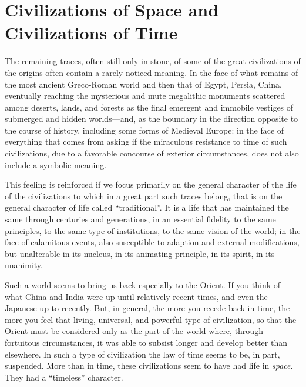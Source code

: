 \section{Civilizations of Space and Civilizations of Time}

The remaining traces, often still only in stone, of some of the great civilizations of the origins often contain a rarely noticed meaning. In the face of what remains of the most ancient Greco-Roman world and then that of Egypt, Persia, China, eventually reaching the mysterious and mute megalithic monuments scattered among deserts, lands, and forests as the final emergent and immobile vestiges of submerged and hidden worlds---and, as the boundary in the direction opposite to the course of history, including some forms of Medieval Europe: in the face of everything that comes from asking if the miraculous resistance to time of such civilizations, due to a favorable concourse of exterior circumstances, does not also include a symbolic meaning.

This feeling is reinforced if we focus primarily on the general character of the life of the civilizations to which in a great part such traces belong, that is on the general character of life called ``traditional''. It is a life that has maintained the same through centuries and generations, in an essential fidelity to the same principles, to the same type of institutions, to the same vision of the world; in the face of calamitous events, also susceptible to adaption and external modifications, but unalterable in its nucleus, in its animating principle, in its spirit, in its unanimity.

Such a world seems to bring us back especially to the Orient. If you think of what China and India were up until relatively recent times, and even the Japanese up to recently. But, in general, the more you recede back in time, the more you feel that living, universal, and powerful type of civilization, so that the Orient must be considered only as the part of the world where, through fortuitous circumstances, it was able to subsist longer and develop better than elsewhere. In such a type of civilization the law of time seems to be, in part, suspended. More than in time, these civilizations seem to have had life in \emph{space}. They had a ``timeless'' character.

